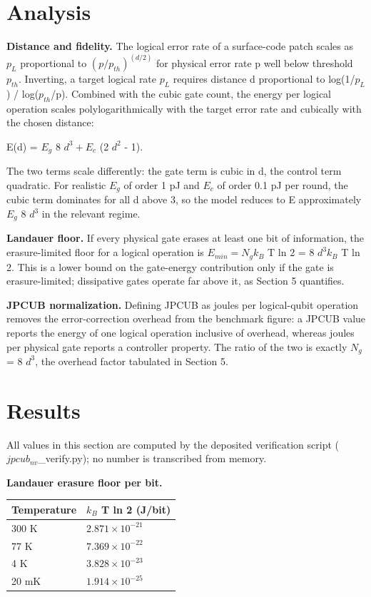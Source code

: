 \documentclass[11pt]{article}
\begin{document}
\section{Analysis}
\textbf{Distance and fidelity.} The logical error rate of a surface-code patch scales as $p_{L}$ proportional to $(p/p_{th})^{(d/2)}$ for physical error rate p well below threshold $p_{th}$. Inverting, a target logical rate $p_{L}$ requires distance d proportional to log(1/$p_{L}$) / log($p_{th}$/p). Combined with the cubic gate count, the energy per logical operation scales polylogarithmically with the target error rate and cubically with the chosen distance:

E(d) = $E_{g}$ 8 $d^{3} + E_{c}$ (2 $d^{2}$ - 1).

The two terms scale differently: the gate term is cubic in d, the control term quadratic. For realistic $E_{g}$ of order 1 pJ and $E_{c}$ of order 0.1 pJ per round, the cubic term dominates for all d above 3, so the model reduces to E approximately $E_{g}$ 8 $d^{3}$ in the relevant regime.

\textbf{Landauer floor.} If every physical gate erases at least one bit of information, the erasure-limited floor for a logical operation is $E_{min} = N_{g}   k_{B}$ T ln 2 = 8 $d^{3}   k_{B}$ T ln 2. This is a lower bound on the gate-energy contribution only if the gate is erasure-limited; dissipative gates operate far above it, as Section 5 quantifies.

\textbf{JPCUB normalization.} Defining JPCUB as joules per logical-qubit operation removes the error-correction overhead from the benchmark figure: a JPCUB value reports the energy of one logical operation inclusive of overhead, whereas joules per physical gate reports a controller property. The ratio of the two is exactly $N_{g}$ = 8 $d^{3}$, the overhead factor tabulated in Section 5.

\section{Results}
All values in this section are computed by the deposited verification script ($jpcub_{nv}$\_verify.py); no number is transcribed from memory.

\textbf{Landauer erasure floor per bit.}

\begin{table}[h]
\centering
\begin{tabular}{ll}
\toprule
Temperature & $k_{B}$ T ln 2 (J/bit) \\
\midrule
300 K & $2.871\times 10^{-21}$ \\
77 K & $7.369\times 10^{-22}$ \\
4 K & $3.828\times 10^{-23}$ \\
20 mK & $1.914\times 10^{-25}$ \\
\bottomrule
\end{tabular}
\end{table}
\end{document}
